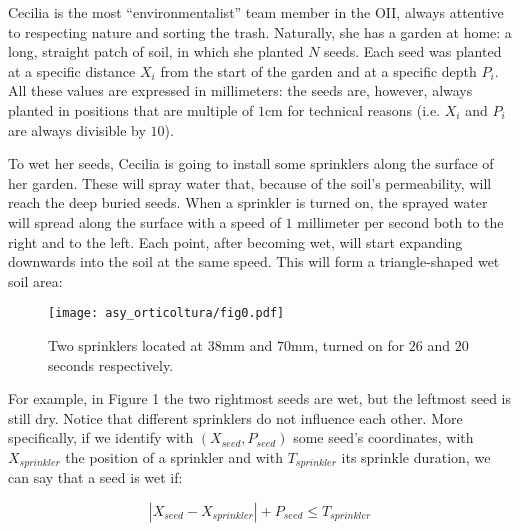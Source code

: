 \usepackage{xcolor}
\usepackage{afterpage}
\usepackage{pifont,mdframed}
\usepackage[bottom]{footmisc}



\renewcommand{\inputfile}{\texttt{stdin}}
\renewcommand{\outputfile}{\texttt{stdout}}
\makeatletter
\renewcommand{\this@inputfilename}{\texttt{stdin}}
\renewcommand{\this@outputfilename}{\texttt{stdout}}
\makeatother


Cecilia is the most ``environmentalist'' team member in the OII, always
attentive to respecting nature and sorting the trash. Naturally, she has a
garden at home: a long, straight patch of soil, in which she planted $N$ seeds.
Each seed was planted at a specific distance $X_i$ from the start of the garden
and at a specific depth $P_i$. All these values are expressed in millimeters:
the seeds are, however, always planted in positions that are multiple of $1$cm
for technical reasons (i.e. $X_i$ and $P_i$ are always divisible by $10$).

To wet her seeds, Cecilia is going to install some sprinklers along the surface
of her garden. These will spray water that, because of the soil's permeability,
will reach the deep buried seeds. When a sprinkler is turned on, the sprayed
water will spread along the surface with a speed of $1$ millimeter per second
both to the right and to the left. Each point, after becoming wet, will start
expanding downwards into the soil at the same speed. This will form a
triangle-shaped wet soil area:%
%
\begin{figure}[H]
  \centering
  \texttt{[image: asy\_orticoltura/fig0.pdf]}
  \caption{Two sprinklers located at $38$mm and $70$mm, turned on for $26$ and $20$ seconds respectively.}
\end{figure}

For example, in Figure 1 the two rightmost seeds are wet, but the leftmost seed
is still dry. Notice that different sprinklers do not influence each other. More
specifically, if we identify with $(X_{seed}, P_{seed})$ some seed's
coordinates, with $X_{sprinkler}$ the position of a sprinkler and with
$T_{sprinkler}$ its sprinkle duration, we can say that a seed is wet if:

$$|X_{seed}-X_{sprinkler}| + P_{seed} \le T_{sprinkler}$$

